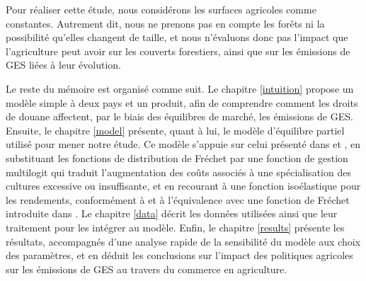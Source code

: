 Pour réaliser cette étude, nous considérons les surfaces agricoles comme constantes. Autrement dit, nous ne prenons pas en compte les forêts ni la possibilité qu'elles changent de taille, et nous n'évaluons donc pas l’impact que l’agriculture peut avoir sur les couverts forestiers, ainsi que sur les émissions de GES liées à leur évolution.

Le reste du mémoire est organisé comme suit. Le chapitre \ref{intuition} propose un modèle simple à deux pays et un produit, afin de comprendre comment les droits de douane affectent, par le biais des équilibres de marché, les émissions de GES. Ensuite, le chapitre \ref{model} présente, quant à lui, le modèle d’équilibre partiel utilisé pour mener notre étude. Ce modèle s’appuie sur celui présenté dans \cite{Gouel2021} et \cite{Gouel2025}, en substituant les fonctions de distribution de Fréchet par une fonction de gestion multilogit qui traduit l’augmentation des coûts associés à une spécialisation des cultures excessive ou insuffisante, et en recourant à une fonction isoélastique pour les rendements, conformément à \cite{Carpentier2013} et à l’équivalence avec une fonction de Fréchet introduite dans \cite{Gouel202x}. Le chapitre \ref{data} décrit les données utilisées ainsi que leur traitement pour les intégrer au modèle. Enfin, le chapitre \ref{results} présente les résultats, accompagnés d’une analyse rapide de la sensibilité du modèle aux choix des paramètres, et en déduit les conclusions sur l’impact des politiques agricoles sur les émissions de GES au travers du commerce en agriculture.
